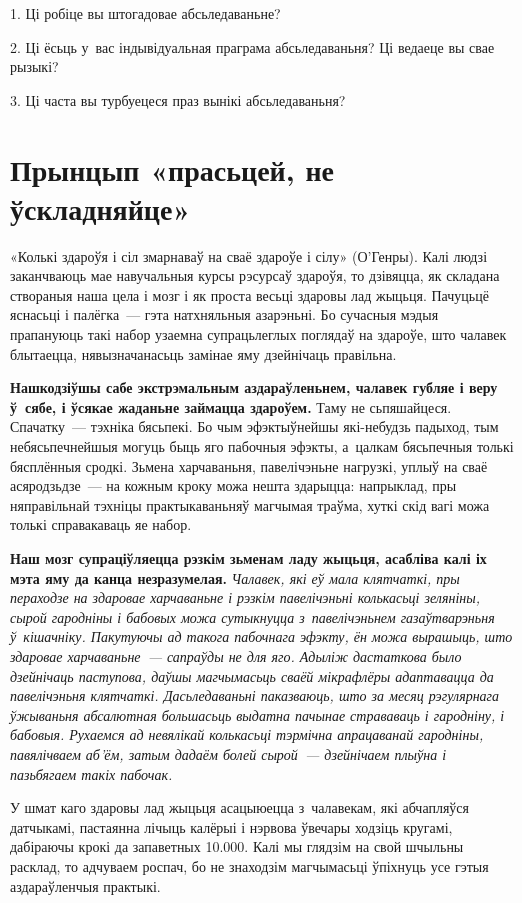 1. Ці робіце вы штогадовае абсьледаваньне?

2. Ці ёсьць у~вас індывідуальная праграма абсьледаваньня? Ці ведаеце вы свае рызыкі?

3. Ці часта вы турбуецеся праз вынікі абсьледаваньня?


\section{Прынцып «прасьцей, не ўскладняйце»}

«Колькі здароўя і сіл змарнаваў на сваё здароўе і сілу» (О'Генры). Калі людзі заканчваюць мае навучальныя курсы рэсурсаў здароўя, то дзівяцца, як складана створаныя наша цела і мозг і як проста весьці здаровы лад жыцьця. Пачуцьцё яснасьці і палёгка~--- гэта натхняльныя азарэньні. Бо сучасныя мэдыя прапануюць такі набор узаемна супрацьлеглых поглядаў на здароўе, што чалавек блытаецца, нявызначанасьць замінае яму дзейнічаць правільна.

\textbf{Нашкодзіўшы сабе экстрэмальным аздараўленьнем, чалавек губляе і веру ў~сябе, і ўсякае жаданьне займацца здароўем.} Таму не сьпяшайцеся. Спачатку~--- тэхніка бясьпекі. Бо чым эфэктыўнейшы які-небудзь падыход, тым небясьпечнейшыя могуць быць яго пабочныя эфэкты, а~цалкам бясьпечныя толькі бясплённыя сродкі. Зьмена харчаваньня, павелічэньне нагрузкі, уплыў на сваё асяродзьдзе~--- на кожным кроку можа нешта здарыцца: напрыклад, пры няправільнай тэхніцы практыкаваньняў магчымая траўма, хуткі скід вагі можа толькі справакаваць яе набор.

\textbf{Наш мозг супраціўляецца рэзкім зьменам ладу жыцьця, асабліва калі іх мэта яму да канца незразумелая.} \emph{Чалавек, які еў мала клятчаткі, пры пераходзе на здаровае харчаваньне і рэзкім павелічэньні колькасьці зеляніны, сырой гародніны і бабовых можа сутыкнуцца з~павелічэньнем газаўтварэньня ў~кішачніку. Пакутуючы ад такога пабочнага эфэкту, ён можа вырашыць, што здаровае харчаваньне~--- сапраўды не для яго. Адыліж дастаткова было дзейнічаць паступова, даўшы магчымасьць сваёй мікрафлёры адаптавацца да павелічэньня клятчаткі. Дасьледаваньні паказваюць, што за месяц рэгулярнага ўжываньня абсалютная большасьць выдатна пачынае страваваць і гародніну, і бабовыя. Рухаемся ад невялікай колькасьці тэрмічна апрацаванай гародніны, павялічваем аб'ём, затым дадаём болей сырой~--- дзейнічаем плыўна і пазьбягаем такіх пабочак.}

У шмат каго здаровы лад жыцьця асацыюецца з~чалавекам, які абчапляўся датчыкамі, пастаянна лічыць калёрыі і нэрвова ўвечары ходзіць кругамі, дабіраючы крокі да запаветных 10.000. Калі мы глядзім на свой шчыльны расклад, то адчуваем роспач, бо не знаходзім магчымасьці ўпіхнуць усе гэтыя аздараўленчыя практыкі. 

